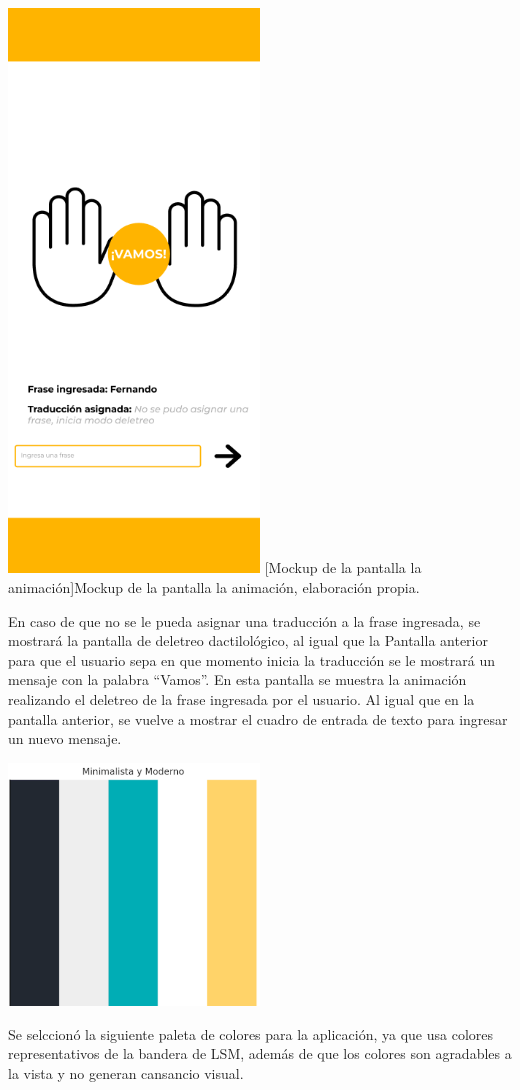 \begin{center}
    \includegraphics[width=0.5\textwidth]{Images/Cap 3/Pantalla4.png}
    [Mockup de la pantalla la animación]{Mockup de la pantalla la animación, elaboración propia.}
\end{center}

En caso de que no se le pueda asignar una traducción a la frase ingresada, se mostrará la pantalla de deletreo dactilológico, al igual que la Pantalla anterior para que el usuario sepa en que momento inicia la traducción se le mostrará un mensaje con la palabra “Vamos”. En esta pantalla se muestra la animación realizando el deletreo de la frase ingresada por el usuario. Al igual que en la pantalla anterior, se vuelve a mostrar el cuadro de entrada de texto para ingresar un nuevo mensaje.

\begin{center}
	\includegraphics[width=0.5\textwidth]{Images/Cap 3/Paleta.png}
\end{center}
Se selccionó la siguiente paleta de colores para la aplicación, ya que usa colores representativos de la bandera de LSM, además de que los colores son agradables a la vista y no generan cansancio visual.

